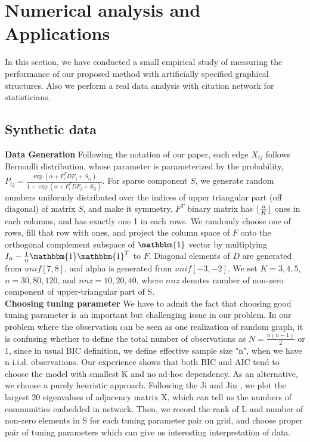 \documentclass[AMS,STIX1COL]{WileyNJD-v2}
\DeclarePairedDelimiter\floor{\lfloor}{\rfloor}
\begin{document}
\section{ Numerical analysis and Applications}
In this section, we have conducted a small empirical study of measuring the performance of our proposed method with artificially specified graphical structures. 
Also we perform a real data analysis with citation network for statisticians.

\subsection{Synthetic data}
\textbf{Data Generation} Following the notation of our paper, each edge $X_{ij}$ follows Bernoulli distribution, whose parameter is parameterized by the probability, $P_{ij}=\frac{\exp (
\alpha+F_{i}^{T}DF_{j} +  S_{ij})}{1+\exp(\alpha+F_{i}^{T}DF_{j}+S_{ij})}$. 
For sparse component $S$, we generate random numbers uniformly distributed over the indices of upper triangular part (off diagonal) of matrix $S$, and make it symmetry. 
$F^{T}$ binary matrix has $\floor{\frac{n}{K}}$ ones in each columns, and has exactly one 1 in each rows.
We randomly choose one of rows, fill that row with ones, and project the column space of $F$ onto the orthogonal complement subspace of $\mathbbm{1}$ vector by multiplying $I_{n}-\frac{1}{n}\mathbbm{1}\mathbbm{1}^T$ to $F$. 
Diagonal elements of $D$ are generated from $unif[7,8]$, and alpha is generated from $unif[-3,-2]$. 
We set $K=3,4,5$, $n=30,80,120$, and $nnz = 10, 20, 40$, where $nnz$ denotes number of non-zero component of upper-triangular part of S.\\

\noindent \textbf{Choosing tuning parameter}
We have to admit the fact that choosing good tuning parameter is an important but challenging issue in our problem.
In our problem where the observation can be seen as one realization of random graph, it is confusing whether to define the total number of observations as $N=\frac{n(n-1)}{2}$ or 1, since in usual BIC definition, we define effective sample size "n", when we have n i.i.d. observations. 
Our experience shows that both BIC and AIC tend to choose the model with smallest K and no ad-hoc dependency. 
As an alternative, we choose a purely heuristic approach. 
Following the Ji and Jin \cite{ji2016coauthorship}, we plot the largest 20 eigenvalues of adjacency matrix X, which can tell us the numbers of communities embedded in network. 
Then, we record the rank of L and number of non-zero elements in S for each tuning parameter pair on grid, and choose proper pair of tuning parameters which can give us interesting interpretation of data. \\
\end{document}
